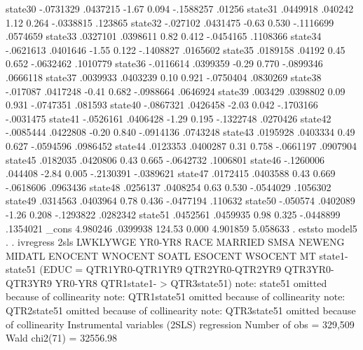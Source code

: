     state30 {\VBAR}  -.0731329   .0437215    -1.67   0.094    -.1588257      .01256
     state31 {\VBAR}   .0449918    .040242     1.12   0.264    -.0338815     .123865
     state32 {\VBAR}   -.027102   .0431475    -0.63   0.530    -.1116699    .0574659
     state33 {\VBAR}   .0327101   .0398611     0.82   0.412    -.0454165    .1108366
     state34 {\VBAR}  -.0621613   .0401646    -1.55   0.122    -.1408827    .0165602
     state35 {\VBAR}   .0189158     .04192     0.45   0.652    -.0632462    .1010779
     state36 {\VBAR}  -.0116614   .0399359    -0.29   0.770    -.0899346    .0666118
     state37 {\VBAR}   .0039933   .0403239     0.10   0.921    -.0750404    .0830269
     state38 {\VBAR}   -.017087   .0417248    -0.41   0.682    -.0988664    .0646924
     state39 {\VBAR}    .003429   .0398802     0.09   0.931    -.0747351     .081593
     state40 {\VBAR}  -.0867321   .0426458    -2.03   0.042    -.1703166   -.0031475
     state41 {\VBAR}  -.0526161   .0406428    -1.29   0.195    -.1322748    .0270426
     state42 {\VBAR}  -.0085444   .0422808    -0.20   0.840    -.0914136    .0743248
     state43 {\VBAR}   .0195928   .0403334     0.49   0.627    -.0594596    .0986452
     state44 {\VBAR}   .0123353   .0400287     0.31   0.758    -.0661197    .0907904
     state45 {\VBAR}   .0182035   .0420806     0.43   0.665    -.0642732    .1006801
     state46 {\VBAR}  -.1260006    .044408    -2.84   0.005    -.2130391   -.0389621
     state47 {\VBAR}   .0172415   .0403588     0.43   0.669    -.0618606    .0963436
     state48 {\VBAR}   .0256137   .0408254     0.63   0.530    -.0544029    .1056302
     state49 {\VBAR}   .0314563   .0403964     0.78   0.436    -.0477194     .110632
     state50 {\VBAR}   -.050574   .0402089    -1.26   0.208    -.1293822    .0282342
     state51 {\VBAR}   .0452561   .0459935     0.98   0.325    -.0448899    .1354021
       _cons {\VBAR}   4.980246   .0399938   124.53   0.000     4.901859    5.058633
{\smallskip}
. eststo model5
{\smallskip}
. 
. ivregress 2sls LWKLYWGE YR0-YR8 RACE MARRIED SMSA NEWENG MIDATL ENOCENT WNOCENT SOATL ESOCENT WSOCENT MT  state1-state51 (EDUC = QTR1YR0-QTR1YR9 QTR2YR0-QTR2YR9 QTR3YR0-QTR3YR9 YR0-YR8 QTR1state1-
> QTR3state51)
note: state51 omitted because of collinearity
note: QTR1state51 omitted because of collinearity
note: QTR2state51 omitted because of collinearity
note: QTR3state51 omitted because of collinearity
{\smallskip}
Instrumental variables (2SLS) regression          Number of obs   =    329,509
                                                  Wald chi2(71)   =   32556.98
